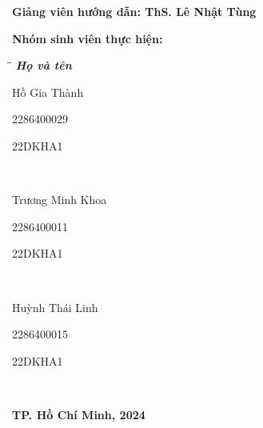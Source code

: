 \begin{titlepage}
		\vspace{15pt}
		\textbf{Giảng viên hướng dẫn: ThS. Lê Nhật Tùng}
		
		\vspace{10pt}
		\textbf{Nhóm sinh viên thực hiện:}
		
		\begin{tabbing}
			\hspace{8cm}\=\hspace{4cm}\=\hspace{3cm} \kill
			{\it \textbf{Họ và tên}}\\
			\begin{bfseries}Hồ Gia Thành\end{bfseries}\> \begin{bfseries}2286400029\end{bfseries}\> \begin{bfseries}22DKHA1\end{bfseries}\\
			\begin{bfseries}Trương Minh Khoa\end{bfseries}\> \begin{bfseries}2286400011\end{bfseries}\> \begin{bfseries}22DKHA1\end{bfseries}\\
			\begin{bfseries}Huỳnh Thái Linh\end{bfseries}\> \begin{bfseries}2286400015\end{bfseries}\> \begin{bfseries}22DKHA1\end{bfseries}\\
			
			
		\end{tabbing}
		\vspace{110pt}
		\begin{center}
			\textbf{TP. Hồ Chí Minh, 2024}
		\end{center}
	\end{titlepage}